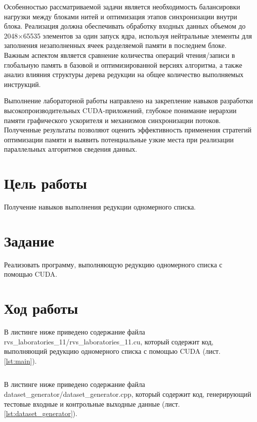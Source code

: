 \documentclass[14pt]{extarticle}
\makeatletter
\newenvironment{code}{\captionsetup{type=listing, belowskip=-14pt plus 3pt minus 0pt}}{}
\newcommand{\numbersections}{\renewcommand{\Hy@numberline}[1]{##1~}}
\let\oldsection\section
\renewcommand{\section}{\numbersections\oldsection}
\makeatother
\begin{document}
Особенностью рассматриваемой задачи является необходимость балансировки нагрузки между блоками нитей и оптимизация этапов синхронизации внутри блока. Реализация должна обеспечивать обработку входных данных объемом до 2048×65535 элементов за один запуск ядра, используя нейтральные элементы для заполнения незаполненных ячеек разделяемой памяти в последнем блоке. Важным аспектом является сравнение количества операций чтения/записи в глобальную память в базовой и оптимизированной версиях алгоритма, а также анализ влияния структуры дерева редукции на общее количество выполняемых инструкций.

Выполнение лабораторной работы направлено на закрепление навыков разработки высокопроизводительных CUDA-приложений, глубокое понимание иерархии памяти графического ускорителя и механизмов синхронизации потоков. Полученные результаты позволяют оценить эффективность применения стратегий оптимизации памяти и выявить потенциальные узкие места при реализации параллельных алгоритмов сведения данных.

\section{Цель работы}

Получение навыков выполнения редукции одномерного списка.

\section{Задание}

Реализовать программу, выполняющую редукцию одномерного списка с помощью CUDA.

\section{Ход работы}

В листинге ниже приведено содержание файла rvs\_laboratories\_11/\-rvs\_lab\-orat\-ories\_11.cu, который содержит код, выполняющий редукцию одномерного списка с помощью CUDA (лист. \ref{lst:main}).

\begin{code}    
\caption{Содержание rvs\_laboratories\_11/rvs\_laboratories\_11.cu\label{lst:main}}
\inputminted{c++}{../rvs_laboratories_11/rvs_laboratories_11.cu}
\end{code}

В листинге ниже приведено содержание файла dataset\_generator/data\-set\-\_gen\-er\-at\-or.cpp, который содержит код, генерирующий тестовые входные и контрольные выходные данные (лист. \ref{lst:dataset_generator}).
\end{document}
